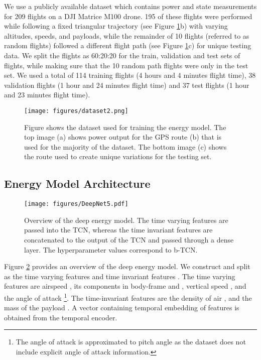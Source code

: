 \documentclass[letterpaper, 10 pt, conference]{ieeeconf}
\begin{document}
We use a publicly available dataset \cite{rodrigues2021inflight, Rodrigues} which contains power and state measurements for 209 flights on a DJI Matrice M100 drone. 195 of these flights were performed while following a fixed triangular trajectory (see Figure \ref{fig:flight_paths}b) with varying altitudes, speeds, and payloads, while the remainder of 10 flights (referred to as random flights) followed a different flight path (see Figure \ref{fig:flight_paths}c) for unique testing data. We split the flights as 60:20:20 for the train, validation and test sets of flights, while making sure that the 10 random path flights were only in the test set. We used a total of 114 training flights (4 hours and 4 minutes flight time), 38 validation flights (1 hour and 24 minutes flight time) and 37 test flights (1 hour and 23 minutes flight time).
\begin{figure}
    \centering
    \texttt{[image: figures/dataset2.png]}
    \caption{Figure shows the dataset used for training the energy model. The top image (a) shows power output for the GPS route (b) that is used for the majority of the dataset. The bottom image (c) shows the route used to create unique variations for the testing set.}
    \label{fig:flight_paths}
    \vspace{-3.5mm}
\end{figure}
\subsection{Energy Model Architecture}

\begin{figure}
    \centering
    \texttt{[image: figures/DeepNet5.pdf]} 
\caption{Overview of the deep energy model. The time varying features are passed into the TCN, whereas the time invariant features are concatenated to the output of the TCN and passed through a dense layer. The hyperparameter values correspond to b-TCN.}
    \label{fig:deep_net}
\end{figure}



Figure \ref{fig:deep_net} provides an overview of the deep energy model. We construct and split   as the time varying features  and time invariant features .  
The time varying features  are airspeed , its components in body-frame  and , vertical speed , and the angle of attack  \footnote{The angle of attack is approximated to pitch angle as the dataset does not include explicit angle of attack information.}. The time-invariant features  are the density of air , and the mass of the payload .
A vector  containing temporal embedding of features is obtained from the temporal encoder.
\end{document}
